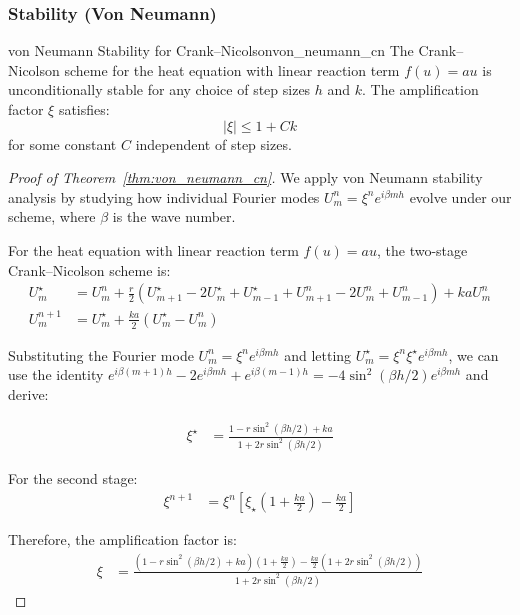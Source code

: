 \subsubsection{Stability (Von Neumann)}
\begin{theorem}{von Neumann Stability for Crank--Nicolson}{von_neumann_cn}
  The Crank--Nicolson scheme for the heat equation with linear reaction term $f(u) = au$ is unconditionally stable for any choice of step sizes $h$ and $k$. The amplification factor $\xi$ satisfies:
  \[
    |\xi| \leq 1 + Ck
  \]
  for some constant $C$ independent of step sizes.
\end{theorem}

\begin{proof}[Proof of Theorem~\ref{thm:von_neumann_cn}]
  We apply von Neumann stability analysis by studying how individual Fourier modes $U_m^n = \xi^n e^{i\beta mh}$ evolve under our scheme, where $\beta$ is the wave number.
  
  For the heat equation with linear reaction term $f(u) = au$, the two-stage Crank--Nicolson scheme is:
  \begin{align*}
    U_m^\star &= U_m^n + \frac{r}{2}\left(U_{m+1}^\star - 2U_m^\star + U_{m-1}^\star + U_{m+1}^n - 2U_m^n + U_{m-1}^n\right) + kaU_m^n \\
    U_m^{n+1} &= U_m^\star + \frac{ka}{2}(U_m^\star - U_m^n)
  \end{align*}
  
  Substituting the Fourier mode $U_m^n = \xi^n e^{i\beta mh}$ and letting $U_m^\star = \xi^n \xi^\star e^{i\beta mh}$, we can use the identity $e^{i\beta (m+1)h} - 2e^{i\beta mh} + e^{i\beta (m-1)h} = -4\sin^2(\beta h/2)e^{i\beta mh}$ and derive:
  
  \begin{align*}
    \xi^\star &= \frac{1 - r\sin^2(\beta h/2) + ka}{1 + 2r\sin^2(\beta h/2)}
  \end{align*}
  
  For the second stage:
  \begin{align*}
    \xi^{n+1} &= \xi^n\left[\xi_\star\left(1 + \frac{ka}{2}\right) - \frac{ka}{2}\right]
  \end{align*}
  
  Therefore, the amplification factor is:
  \begin{align*}
    \xi &= \frac{\left(1 - r\sin^2(\beta h/2) + ka\right)\left(1 + \frac{ka}{2}\right) - \frac{ka}{2}\left(1 + 2r\sin^2(\beta h/2)\right)}{1 + 2r\sin^2(\beta h/2)}
  \end{align*}
  

\end{proof}
